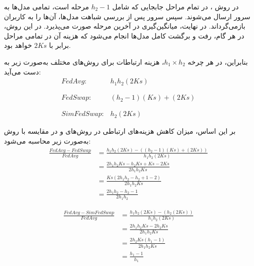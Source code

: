 در روش ، در تمام مراحل جابجایی که شامل \( h_2 - 1 \) مرحله است، تمامی مدل‌ها به سرور ارسال می‌شوند. سپس سرور پس از بررسی شباهت مدل‌ها، آن‌ها را به کاربران بازمی‌گرداند. در نهایت، میانگین‌گیری در آخرین مرحله صورت می‌پذیرد. در این روش، در هر گام، رفت و برگشت کامل مدل‌ها انجام می‌شود که هزینه آن در تمامی مراحل برابر با \( 2Ks \) خواهد بود.

بنابراین، در هر چرخه \( h_1 \times h_2 \)، هزینه ارتباطات برای روش‌های مختلف به‌صورت زیر به دست می‌آید:
\begin{equation}
	\begin{array}{ll}
		FedAvg: & h_1h_2 (2Ks)
		\\ \\ \\
		FedSwap: & (h_2-1)(Ks) + (2Ks)
		\\ \\ \\
		SimFedSwap: & h_2(2Ks)
	\end{array}
\end{equation}


بر این اساس، میزان کاهش هزینه‌های ارتباطی در روش‌های  و  در مقایسه با روش  به‌صورت زیر محاسبه می‌شود:
\begingroup
\addtolength{\jot}{0.5em}
\begin{equation}
	\begin{aligned} 
		\frac{FedAvg-FedSwap}{FedAvg}
		&= \frac{h_1h_2(2Ks)-((h_2-1)(Ks)+(2Ks))}{h_1h_2(2Ks)} \\
		&= \frac{2h_1h_2Ks-h_2Ks+Ks-2Ks}{2h_1h_2Ks} \\
		&= \frac{Ks(2h_1h_2 -h_2 +1 -2)}{2h_1h_2Ks} \\
		&= \frac{2h_1h_2 -h_2 -1}{2h_1h_2}
	\end{aligned}
\end{equation}
\endgroup

\begingroup
\addtolength{\jot}{0.5em}
\begin{equation}
	\begin{aligned} 
		\frac{FedAvg-SimFedSwap}{FedAvg}
		&= \frac{h_1h_2(2Ks)-(h_2(2Ks))}{h_1h_2(2Ks)} \\
		&= \frac{2h_1h_2Ks-2h_2Ks}{2h_1h_2Ks} \\
		&= \frac{2h_2Ks(h_1 -1)}{2h_1h_2Ks} \\
		&= \frac{h_1 -1}{h_1}
	\end{aligned}
\end{equation}
\endgroup


